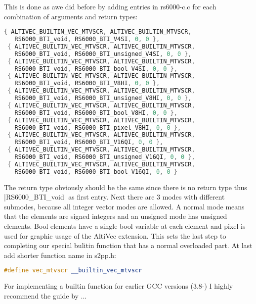 This is done as awe did before by adding entries in rs6000-c.c for each combination of arguments and return types:
\begin{lstlisting}[language=C++,basicstyle=\ttfamily\scriptsize,keywordstyle=\color{red}] 
 { ALTIVEC_BUILTIN_VEC_MTVSCR, ALTIVEC_BUILTIN_MTVSCR,
   RS6000_BTI_void, RS6000_BTI_V4SI, 0, 0 },
 { ALTIVEC_BUILTIN_VEC_MTVSCR, ALTIVEC_BUILTIN_MTVSCR,
   RS6000_BTI_void, RS6000_BTI_unsigned_V4SI, 0, 0 },
 { ALTIVEC_BUILTIN_VEC_MTVSCR, ALTIVEC_BUILTIN_MTVSCR,
   RS6000_BTI_void, RS6000_BTI_bool_V4SI, 0, 0 },
 { ALTIVEC_BUILTIN_VEC_MTVSCR, ALTIVEC_BUILTIN_MTVSCR,
   RS6000_BTI_void, RS6000_BTI_V8HI, 0, 0 },
 { ALTIVEC_BUILTIN_VEC_MTVSCR, ALTIVEC_BUILTIN_MTVSCR,
   RS6000_BTI_void, RS6000_BTI_unsigned_V8HI, 0, 0 },
 { ALTIVEC_BUILTIN_VEC_MTVSCR, ALTIVEC_BUILTIN_MTVSCR,
   RS6000_BTI_void, RS6000_BTI_bool_V8HI, 0, 0 },
 { ALTIVEC_BUILTIN_VEC_MTVSCR, ALTIVEC_BUILTIN_MTVSCR,
   RS6000_BTI_void, RS6000_BTI_pixel_V8HI, 0, 0 },
 { ALTIVEC_BUILTIN_VEC_MTVSCR, ALTIVEC_BUILTIN_MTVSCR,
   RS6000_BTI_void, RS6000_BTI_V16QI, 0, 0 },
 { ALTIVEC_BUILTIN_VEC_MTVSCR, ALTIVEC_BUILTIN_MTVSCR,
   RS6000_BTI_void, RS6000_BTI_unsigned_V16QI, 0, 0 },
 { ALTIVEC_BUILTIN_VEC_MTVSCR, ALTIVEC_BUILTIN_MTVSCR,
   RS6000_BTI_void, RS6000_BTI_bool_V16QI, 0, 0 }
\end{lstlisting}
The return type obviously should be the same since there is no return type thus |RS6000_BTI_void| as first entry. Next there are 3 modes with different submodes, because all integer vector modes are allowed. A normal mode means that the elements are signed integers and an unsigned mode has unsigned elements. Bool elements have a single bool variable at each element and pixel is used for graphic usage of the AltiVec extension.
This sets the last step to completing our special bulitin function that has a normal overloaded part.
At last add shorter function name in s2pp.h:
\begin{lstlisting}[language=C++,basicstyle=\ttfamily\scriptsize,keywordstyle=\color{red}] 
#define vec_mtvscr __builtin_vec_mtvscr
\end{lstlisting}
For implementing a builtin function for earlier GCC versions (3.8-) I highly recommend the guide by ...

     
